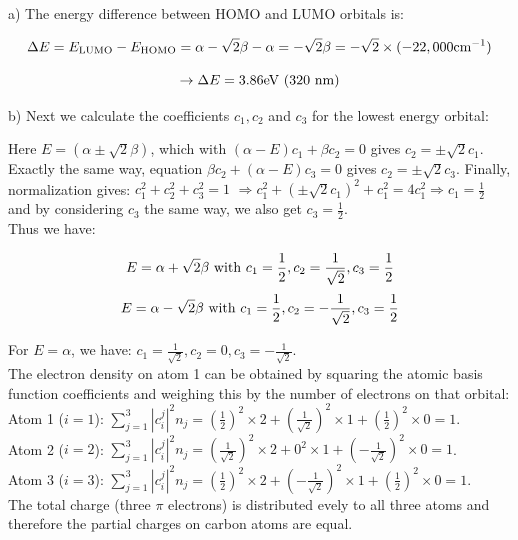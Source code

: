 \noindent
a) The energy difference between HOMO and LUMO orbitals is:

$$\Delta E = E_\textnormal{LUMO} - E_\textnormal{HOMO} = \alpha 
- \sqrt{2}\beta - \alpha = -\sqrt{2}\beta = -\sqrt{2}\times (-22,000
\textnormal{cm}^{-1})$$

$$\rightarrow \Delta E = 3.86 \textnormal{eV}~(320\textnormal{~nm})$$

\noindent
b) Next we calculate the coefficients $c_1, c_2$ and $c_3$ for the lowest
energy orbital:

\noindent
Here $E = (\alpha\pm\sqrt{2}\beta)$, which with $(\alpha - E)c_1 + \beta c_2 = 0$
gives $c_2 = \pm\sqrt{2}c_1$. Exactly the same way, equation
$\beta c_2 + (\alpha - E)c_3 = 0$ gives $c_2 = \pm\sqrt{2}c_3$.
Finally, normalization gives:
$c_1^2 + c_2^2 + c_3^2 = 1$ $\Rightarrow c_1^2 + (\pm\sqrt{2}c_1)^2
+ c_1^2 = 4c_1^2 \Rightarrow c_1 = \frac{1}{2}$ and by considering
$c_3$ the same way, we also get $c_3 = \frac{1}{2}$.\\

\noindent
Thus we have:

$$E = \alpha + \sqrt{2}\beta~\textnormal{with}~c_1 = \frac{1}{2},
c_2 = \frac{1}{\sqrt{2}}, c_3 = \frac{1}{2}$$
$$E = \alpha - \sqrt{2}\beta~\textnormal{with}~c_1 = \frac{1}{2},
c_2 = -\frac{1}{\sqrt{2}}, c_3 = \frac{1}{2}$$

\noindent
For $E = \alpha$, we have: $c_1 = \frac{1}{\sqrt{2}}, c_2 = 0, c_3 
= -\frac{1}{\sqrt{2}}$.\\

\noindent
The electron density on atom 1 can be obtained by squaring the atomic
basis function coefficients and weighing this by the number of electrons
on that orbital:\\

\noindent
Atom 1 ($i = 1$): $\sum_{j=1}^{3}|c_i^j|^2n_j = 
\left(\frac{1}{2}\right)^2\times 2 + \left(\frac{1}{\sqrt{2}}\right)^2
\times 1 + \left(\frac{1}{2}\right)^2\times 0 = 1$.\\
Atom 2 ($i = 2$): $\sum_{j=1}^{3}|c_i^j|^2n_j = 
\left(\frac{1}{\sqrt{2}}\right)^2\times 2 + 0^2
\times 1 + \left(-\frac{1}{\sqrt{2}}\right)^2\times 0 = 1$.\\
Atom 3 ($i = 3$): $\sum_{j=1}^{3}|c_i^j|^2n_j = 
\left(\frac{1}{2}\right)^2\times 2 + \left(-\frac{1}{\sqrt{2}}\right)^2
\times 1 + \left(\frac{1}{2}\right)^2\times 0 = 1$.\\

\noindent
The total charge (three $\pi$ electrons) is distributed evely to all three
atoms and therefore the partial charges on carbon atoms are equal.\\

